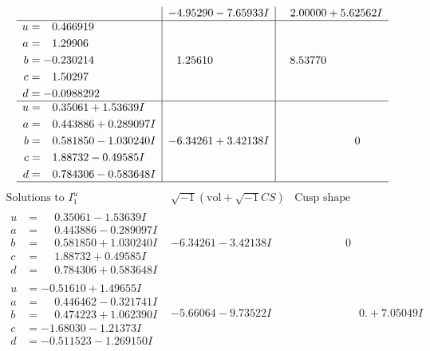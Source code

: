 \documentclass[1p]{elsarticle_modified}
\theoremstyle{definition}
\newcommand{\I}{\sqrt{-1}}
\begin{document}
$$\begin{array}{c|c|c}
 & -4.95290 - 7.65933 I & \phantom{-}2.00000 + 5.62562 I \\ \hline\begin{aligned}
u &= \phantom{-}0.466919\phantom{ +0.000000I} \\
a &= \phantom{-}1.29906\phantom{ +0.000000I} \\
b &= -0.230214\phantom{ +0.000000I} \\
c &= \phantom{-}1.50297\phantom{ +0.000000I} \\
d &= -0.0988292\phantom{ +0.000000I}\end{aligned}
 & \phantom{-}1.25610\phantom{ +0.000000I} & \phantom{-}8.53770\phantom{ +0.000000I} \\ \hline\begin{aligned}
u &= \phantom{-}0.35061 + 1.53639 I \\
a &= \phantom{-}0.443886 + 0.289097 I \\
b &= \phantom{-}0.581850 - 1.030240 I \\
c &= \phantom{-}1.88732 - 0.49585 I \\
d &= \phantom{-}0.784306 - 0.583648 I\end{aligned}
 & -6.34261 + 3.42138 I & \phantom{-0.000000 } 0\\
 \hline 
 \end{array}$$\newpage$$\begin{array}{c|c|c}  
\text{Solutions to }I^u_{1}& \I (\text{vol} + \sqrt{-1}CS) & \text{Cusp shape}\\
 \hline 
\begin{aligned}
u &= \phantom{-}0.35061 - 1.53639 I \\
a &= \phantom{-}0.443886 - 0.289097 I \\
b &= \phantom{-}0.581850 + 1.030240 I \\
c &= \phantom{-}1.88732 + 0.49585 I \\
d &= \phantom{-}0.784306 + 0.583648 I\end{aligned}
 & -6.34261 - 3.42138 I & \phantom{-0.000000 } 0 \\ \hline\begin{aligned}
u &= -0.51610 + 1.49655 I \\
a &= \phantom{-}0.446462 - 0.321741 I \\
b &= \phantom{-}0.474223 + 1.062390 I \\
c &= -1.68030 - 1.21373 I \\
d &= -0.511523 - 1.269150 I\end{aligned}
 & -5.66064 - 9.73522 I & \phantom{-0.000000 -}0. + 7.05049 I \\ \hline\begin{aligned}

\end{aligned}
\end{array}$$
\end{document}
